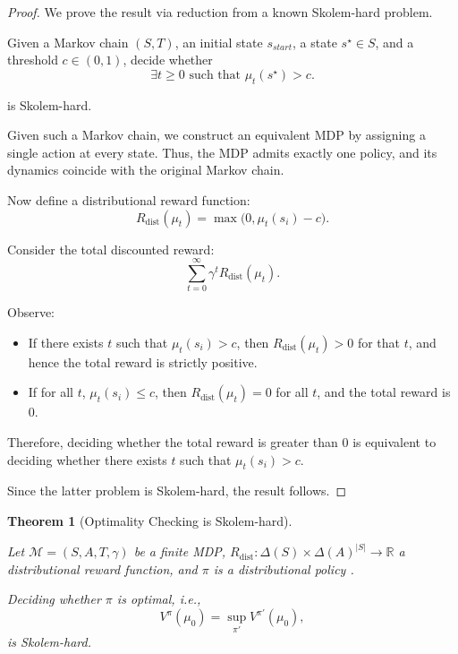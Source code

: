 \documentclass{article}
\newtheorem{theorem}{Theorem}
\begin{document}
\begin{proof}
We prove the result via reduction from a known Skolem-hard problem.

Given a Markov chain $(S,T)$, an initial state $s_{start}$, a state $s^\star \in S$, and a threshold $c \in (0,1)$, decide whether
\[
\exists t \ge 0 \text{ such that } \mu_t(s^\star) > c.
\]

is Skolem-hard.

Given such a Markov chain, we construct an equivalent MDP by assigning a single action at every state. Thus, the MDP admits exactly one policy, and its dynamics coincide with the original Markov chain.

Now define a distributional reward function:
\[
R_{\mathrm{dist}}(\mu_t) = \max\big(0, \mu_t(s_i) - c\big).
\]

Consider the total discounted reward:
\[
\sum_{t=0}^{\infty} \gamma^t R_{\mathrm{dist}}(\mu_t).
\]

Observe:
\begin{itemize}
    \item If there exists $t$ such that $\mu_t(s_i) > c$, then $R_{\mathrm{dist}}(\mu_t) > 0$ for that $t$, and hence the total reward is strictly positive.
    \item If for all $t$, $\mu_t(s_i) \le c$, then $R_{\mathrm{dist}}(\mu_t) = 0$ for all $t$, and the total reward is $0$.
\end{itemize}

Therefore, deciding whether the total reward is greater than $0$ is equivalent to deciding whether there exists $t$ such that $\mu_t(s_i) > c$.

Since the latter problem is Skolem-hard, the result follows.
\end{proof}


\begin{theorem}[Optimality Checking is Skolem-hard] \label{thm: optimality_checking_hardness}

Let $\mathcal{M} = (S,A,T,\gamma)$ be a finite MDP, 
$R_{\mathrm{dist}} : \Delta(S) \times \Delta(A)^{|S|} \to \mathbb{R}$ a distributional reward function, and $\pi$ is a distributional policy .

Deciding whether $\pi$ is optimal, i.e.,
\[
V^\pi(\mu_0) = \sup_{\pi'} V^{\pi'}(\mu_0),
\]
is Skolem-hard.
\end{theorem}
\end{document}
